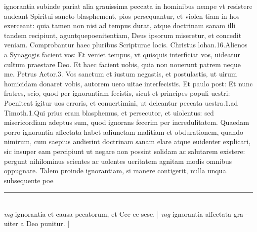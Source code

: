 \documentclass{article}
\begin{document}
\begin{pages}
ignorantia subinde pariat alia grauissima peccata in hominibus  nempe vt resistere audeant Spiritui sancto blasphement, pios persequantur, et violen tiam in hos exerceant: quia tamen non nisi ad tempus durat, atque  doctrinam sanam illi tandem recipiunt, aguntquepoenitentiam, Deus ipsorum miseretur, et concedit veniam. Comprobantur haec pluribus Scripturae locis. Christus lohan.16.Alienos a Synagogis facient vos: Et veniet tempus, vt quisquis interficiat vos, uideatur cultum praestare Deo. Et haec facient uobis, quia non nouerunt patrem neque  me. Petrus Actor.3. Vos sanctum et iustum negastis, et postulastis, ut uirum homicidam donaret vobis, autorem uero uitae interfecistis. Et paulo post: Et nunc fratres, scio, quod per ignorantiam fecistis, sicut et principes populi uestri: Poeniteat igitur uos erroris, et conuertimini, ut deleantur peccata uestra.1.ad Timoth.1.Qui prius eram blasphemus, et persecutor, et uiolentus: sed misericordiam adeptus sum, quod ignorans fecerim per incredulitatem.  \pend\pstart Quaedam porro ignorantia affectata habet adiunctam malitiam et obdurationem, quando nimirum, cum saepius audierint doctrinam sanam elare atque  euidenter explicari, sic insuper eam percipiunt ut negare non possint solidam ac salutarem existere: pergunt nihilominus scientes ac uolentes ueritatem agnitam modis omnibus oppugnare. Talem proinde ignorantiam, si manere contigerit, nulla unqua subsequente poe\pend
\vspace{0.5cm}\noindent
\vspace{0.2cm}\rule{1cm}{0.2pt}\\ 
\hspace{0.2cm}\textit{mg}
\footnotesize ignorantia et causa pecatorum, et Cce ce sese. 
\normalsize| 
\hspace{0.2cm}\textit{mg}
\footnotesize ignorantia affectata gra - uiter a Deo punitur. 
\normalsize| 

\end{pages}
\end{document}
